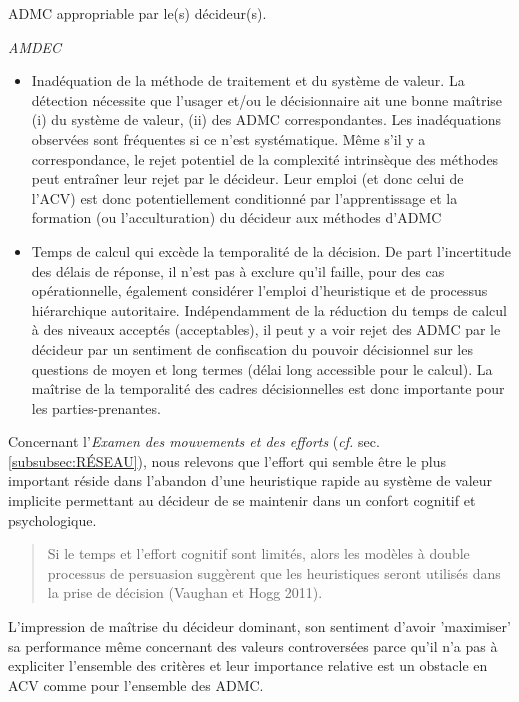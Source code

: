 \begin{itemize}
ADMC appropriable par le(s) décideur(s).

\textit{AMDEC}
\begin{itemize}
\item Inadéquation de la méthode de traitement et du système de valeur.
La détection nécessite que l'usager et/ou le décisionnaire ait une bonne maîtrise (i) du système de valeur, (ii) des \gls{ADMC} correspondantes.
Les inadéquations observées sont fréquentes si ce n'est systématique.
Même s'il y a correspondance, le rejet potentiel de la complexité intrinsèque des méthodes peut entraîner leur rejet par le décideur.
Leur emploi (et donc celui de l'\gls{ACV}) est donc potentiellement conditionné par l'apprentissage et la formation (ou l’acculturation) du décideur aux méthodes d'\gls{ADMC}
\item Temps de calcul qui excède la temporalité de la décision.
De part l'incertitude des délais de réponse, il n'est pas à exclure qu'il faille, pour des cas opérationnelle, également considérer l'emploi d'heuristique et de processus hiérarchique autoritaire.
Indépendamment de la réduction du temps de calcul à des niveaux acceptés (acceptables), il peut y a voir rejet des ADMC par le décideur par un sentiment de confiscation du pouvoir décisionnel sur les questions de moyen et long termes (délai long accessible pour le calcul).
La maîtrise de la temporalité des cadres décisionnelles est donc importante pour les parties-prenantes.
\end{itemize}
\end{itemize}

Concernant l'\emph{Examen des mouvements et des efforts} (\textit{cf.} sec.\ref{subsubsec:RÉSEAU}), nous relevons que l'effort qui semble être le plus important réside dans l'abandon d'une heuristique rapide au système de valeur implicite permettant au décideur de se maintenir dans un confort cognitif et psychologique.
\blockcquote[traduction]{murray_transdisciplinary_2015}{Si le temps et l'effort cognitif sont limités, alors les modèles à double processus de persuasion suggèrent que les heuristiques seront utilisés dans la prise de décision (Vaughan et Hogg 2011).}
L'impression de maîtrise du décideur dominant, son sentiment d'avoir 'maximiser' sa performance même concernant des valeurs controversées parce qu'il n'a pas à expliciter l'ensemble des critères et leur importance relative est un obstacle en \gls{ACV} comme pour l'ensemble des \gls{ADMC}.


